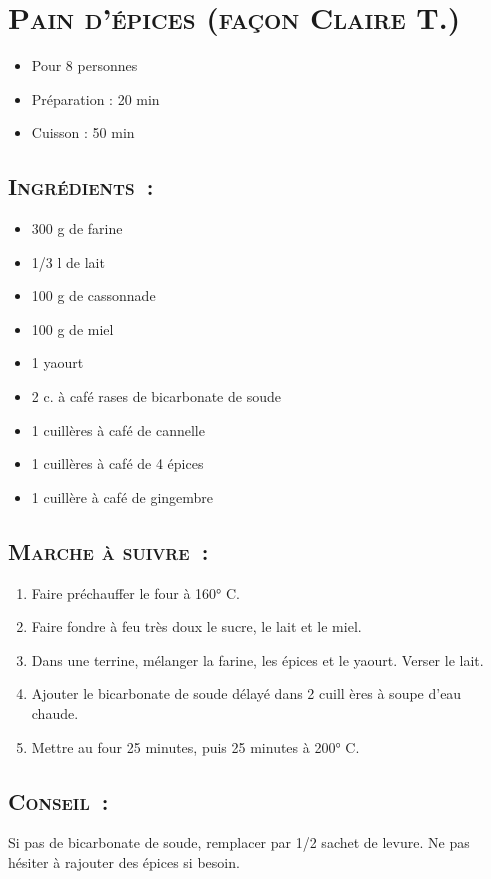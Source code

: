 \section[\normalsize{Pain d'\'epices (fa\c con Claire T.)}]{\LARGE{\textsc{Pain d'\'epices (fa\c con Claire T.)}}}		%


\begin{itemize}
\item Pour 8 personnes
\item Préparation : 20 min
\item Cuisson : 50 min
\end{itemize}

\subsection*{\textsc{Ingr\'edients~:}}

\begin{itemize}

\item 300 g de farine
\item 1/3 l de lait
\item 100 g de cassonnade
\item 100 g de miel
\item 1 yaourt
\item 2 c. \`a caf\'e rases de bicarbonate de soude
\item 1 cuill\`eres \`a caf\'e de cannelle
\item 1 cuill\`eres \`a caf\'e de 4 \'epices
\item 1 cuill\`ere \`a caf\'e de gingembre
\end{itemize}


\subsection*{\textsc{Marche \`a suivre~:}}

\begin{enumerate}

\item Faire pr\'echauffer le four \`a 160° C.
\item Faire fondre \`a feu tr\`es doux le sucre, le lait et le 
miel.
\item Dans une terrine, m\'elanger la farine, les \'epices et le 
yaourt. Verser le lait. 
\item Ajouter le bicarbonate de soude d\'elay\'e dans 2 cuill
\`eres \`a soupe d'eau chaude.
\item Mettre au four 25 minutes, puis 25 minutes \`a 200° C.


\end{enumerate}
\subsection*{\textsc{Conseil~:}}
Si pas de bicarbonate de soude, remplacer par 1/2 sachet de levure.
Ne pas h\'esiter \`a rajouter des \'epices si besoin.